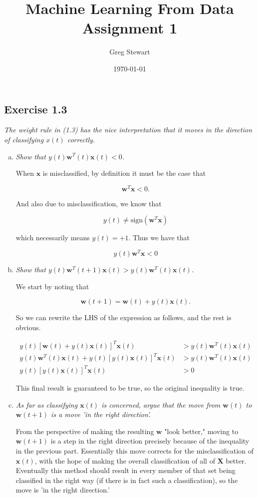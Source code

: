 \documentclass{article}
\title{Machine Learning From Data Assignment 1}
\author{Greg Stewart}
\date{\today}
\renewcommand{\vec}[1]{\mathbf{#1}}
\begin{document}
\maketitle

\subsection*{Exercise 1.3}

\textit{The weight rule in (1.3) has the nice interpretation that it moves in the direction of classifying $x(t)$ correctly.}

\begin{enumerate}[(a)]
	\item \textit{Show that $y(t)\vec{w}^T(t)\vec{x}(t) < 0$.}

    When $\vec{x}$ is misclassified, by definition it must be the case that

    \[ \vec{w}^T \vec{x} < 0. \]

    And also due to misclassification, we know that

    \[ y(t) \neq \text{sign} (\vec{w}^T \vec{x}) \]

    which necessarily means $y(t) = +1$. Thus we have that

    \[ y(t) \vec{w}^T \vec{x} < 0 \]
	
	
	\item \textit{Show that $y(t)\vec{w}^T(t+1)\vec{x}(t) > y(t)\vec{w}^T(t)\vec{x}(t)$.}
	
    We start by noting that 

    \[\vec{w}(t+1) = \vec{w}(t) + y(t)\vec{x}(t).\]

    So we can rewrite the LHS of the expression as follows, and the rest is obvious.

    \begin{align*}
      y(t)[\vec{w}(t) + y(t)\vec{x}(t)]^T\vec{x}(t) &> y(t)\vec{w}^T(t)\vec{x}(t) \\
      y(t)\vec{w}^T(t)\vec{x}(t) + y(t)[y(t)\vec{x}(t)]^T\vec{x}(t) &> y(t)\vec{w}^T(t)\vec{x}(t) \\
      y(t)[y(t)\vec{x}(t)]^T\vec{x}(t) &> 0
    \end{align*}

    This final result is guaranteed to be true, so the original inequality is true.
	
	\item \textit{As far as classifying $\vec{x}(t)$ is concerned, argue that the move from $\vec{w}(t)$ to $\vec{w}(t+1)$ is a move 'in the right direction'.}

    From the perspective of making the resulting $\vec{w}$ "look better," moving to $\vec{w}(t+1)$ is
    a step in the right direction precisely because of the inequality in the previous part. Essentially
    this move corrects for the misclassification of $\vec{x}(t)$, with the hope of making the overall 
    classification of all of $\vec{X}$ better. Eventually this method should result in every member of 
    that set being classified in the right way (if there is in fact such a classification), so the move is 'in the right direction.'
	
	
\end{enumerate}
\end{document}
